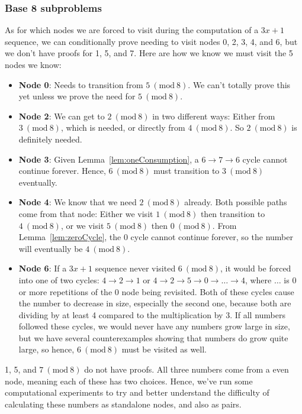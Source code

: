 \documentclass[12pt]{article}
\newcommand{\Mod}[1]{\ (\mathrm{mod}\ #1)}
\theoremstyle{definition}
\begin{document}
\subsubsection{Base 8 subproblems} \label{subsubsec:base8subprob}
As for which nodes we are forced to visit during the computation of a $3x+1$ sequence, we can conditionally prove needing to visit nodes 0, 2, 3, 4, and 6, but we don't have proofs for 1, 5, and 7. Here are how we know we must visit the 5 nodes we know:


\begin{itemize}
    \item \textbf{Node 0}: Needs to transition from $5\Mod{8}$. We can't totally prove this yet unless we prove the need for $5\Mod{8}$.
    \item \textbf{Node 2}: We can get to $2\Mod{8}$ in two different ways: Either from $3\Mod{8}$, which is needed, or directly from $4\Mod{8}$. So $2 \Mod{8}$ is definitely needed. 
    \item \textbf{Node 3}: Given Lemma~\ref{lem:oneConsumption}, a $6 \rightarrow 7 \rightarrow 6$ cycle cannot continue forever. Hence, $6\Mod{8}$ must transition to $3\Mod{8}$ eventually.
    \item \textbf{Node 4}: We know that we need $2\Mod{8}$ already. Both possible paths come from that node: Either we visit $1\Mod{8}$ then transition to $4\Mod{8}$, or we visit $5\Mod{8}$ then $0\Mod{8}$. From Lemma~\ref{lem:zeroCycle}, the 0 cycle cannot continue forever, so the number will eventually be $4\Mod{8}$.
    \item \textbf{Node 6}: If a $3x+1$ sequence never visited $6\Mod{8}$, it would be forced into one of two cycles: $4 \rightarrow 2 \rightarrow 1$ or $4 \rightarrow 2 \rightarrow 5 \rightarrow 0 \rightarrow \ldots \rightarrow 4$, where $\ldots$ is 0 or more repetitions of the 0 node being revisited. Both of these cycles cause the number to decrease in size, especially the second one, because both are dividing by at least 4 compared to the multiplication by 3. If all numbers followed these cycles, we would never have any numbers grow large in size, but we have several counterexamples showing that numbers do grow quite large, so hence, $6\Mod{8}$ must be visited as well.
   
\end{itemize}
1, 5, and $7\Mod{8}$ do not have proofs. All three numbers come from a even node, meaning each of these has two choices. Hence, we've run some computational experiments to try and better understand the difficulty of calculating these numbers as standalone nodes, and also as pairs. 
\end{document}
